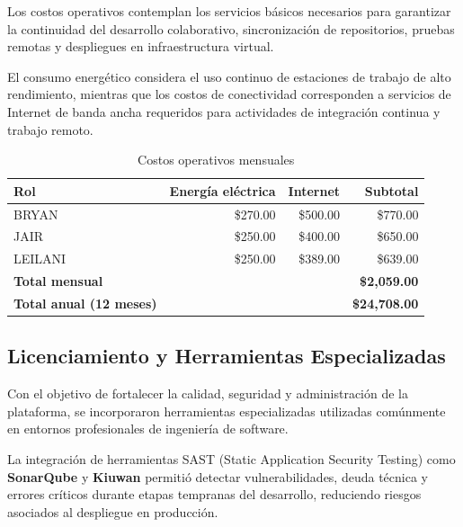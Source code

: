 \documentclass[12pt,oneside,letterpaper]{book}
\begin{document}
Los costos operativos contemplan los servicios básicos necesarios para garantizar la continuidad del desarrollo colaborativo, sincronización de repositorios, pruebas remotas y despliegues en infraestructura virtual.

El consumo energético considera el uso continuo de estaciones de trabajo de alto rendimiento, mientras que los costos de conectividad corresponden a servicios de Internet de banda ancha requeridos para actividades de integración continua y trabajo remoto.

\begin{table}[H]
\centering
\caption{Costos operativos mensuales}

\begin{tabular}{lrrr}
\toprule
\rowcolor{headerblue}
\textbf{Rol} & \textbf{Energía eléctrica} & \textbf{Internet} & \textbf{Subtotal} \\
\midrule

BRYAN & \$270.00 & \$500.00 & \$770.00 \\

JAIR & \$250.00 & \$400.00 & \$650.00 \\

LEILANI & \$250.00 & \$389.00 & \$639.00 \\

\midrule
\textbf{Total mensual} & & & \textbf{\$2,059.00} \\

\textbf{Total anual (12 meses)} & & & \textbf{\$24,708.00} \\

\bottomrule
\end{tabular}
\end{table}

\vspace{0.5cm}

\subsection{Licenciamiento y Herramientas Especializadas}

Con el objetivo de fortalecer la calidad, seguridad y administración de la plataforma, se incorporaron herramientas especializadas utilizadas comúnmente en entornos profesionales de ingeniería de software.

La integración de herramientas SAST (Static Application Security Testing) como \textbf{SonarQube} y \textbf{Kiuwan} permitió detectar vulnerabilidades, deuda técnica y errores críticos durante etapas tempranas del desarrollo, reduciendo riesgos asociados al despliegue en producción.
\end{document}
